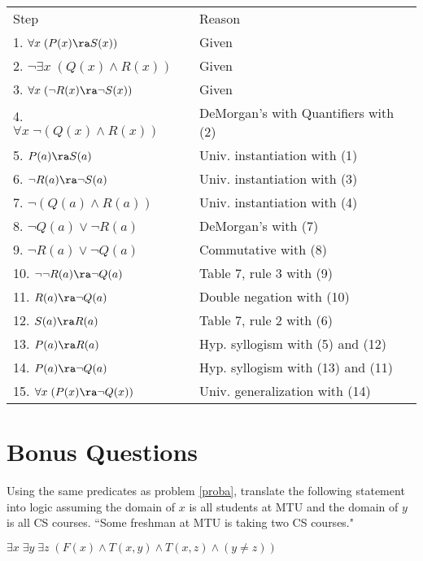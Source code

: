 \begin{questions}
\begin{solution}
    \begin{tabular}{lll}
            Step                    & \hspace{0.15in} & Reason \\
            1. $\forall x\; (P(x) \ra S(x))$            & & Given \\
            2. $\neg \exists x\; (Q(x) \wedge R(x))$    & & Given \\
            3. $\forall x\; (\neg R(x) \ra \neg S(x))$  & & Given \\
            4. $\forall x\; \neg (Q(x) \wedge R(x))$    & & DeMorgan's with Quantifiers with (2) \\
            5. $P(a) \ra S(a)$                          & & Univ. instantiation with (1) \\
            6. $\neg R(a) \ra \neg S(a)$                & & Univ. instantiation with (3) \\
            7. $\neg (Q(a) \wedge R(a))$                & & Univ. instantiation with (4) \\
            8. $\neg Q(a) \vee \neg R(a)$               & & DeMorgan's with (7) \\
            9. $\neg R(a) \vee \neg Q(a)$               & & Commutative with (8) \\
            10. $\neg \neg R(a) \ra \neg Q(a)$          & & Table 7, rule 3 with (9) \\
            11. $R(a) \ra \neg Q(a)$                    & & Double negation with (10) \\
            12. $S(a) \ra R(a)$                         & & Table 7, rule 2 with (6) \\
            13. $P(a) \ra R(a)$                         & & Hyp. syllogism with (5) and (12) \\
            14. $P(a) \ra \neg Q(a)$                    & & Hyp. syllogism with (13) and (11) \\
            15. $\forall x\; (P(x) \ra \neg Q(x))$      & & Univ. generalization with (14)
    \end{tabular}
\end{solution}

\section*{Bonus Questions}

\bonusquestion[2] Using the same predicates as problem \ref{proba}, translate the following statement into logic assuming the domain of $x$ is all students at MTU and the domain of $y$ is all CS courses.
``Some freshman at MTU is taking two CS courses."
    \ifprintanswers
        \vspace{-12pt}
    \fi
\begin{solution}
	$\exists x\; \exists y\; \exists z\;(F(x) \wedge T(x,y) \wedge T(x,z) \wedge (y \neq z))$
\end{solution}



\end{questions}
